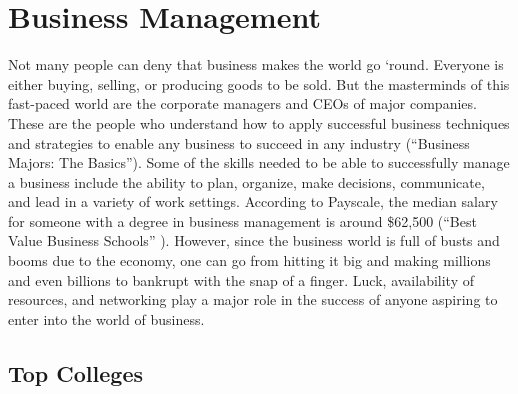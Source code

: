 \chapter{Business Management}
\begin{multicols}{2}

Not many people can deny that business makes the world go ‘round. Everyone is either buying, selling, or producing goods to be sold. But the masterminds of this fast-paced world are the corporate managers and CEOs of major companies. These are the people who understand how to apply successful business techniques and strategies to enable any business to succeed in any industry (“Business Majors: The Basics”). Some of the skills needed to be able to successfully manage a business include the ability to plan, organize, make decisions, communicate, and lead in a variety of work settings.  According to Payscale, the median salary for someone with a degree in business management is around \$62,500 (“Best Value Business Schools” ). However, since the business world is full of busts and booms due to the economy, one can go from hitting it big and making millions and even billions to bankrupt with the snap of a finger. Luck, availability of resources, and networking play a major role in the success of anyone aspiring to enter into the world of business. 

\end{multicols}

\section{Top Colleges}

\begin{table}[H]
\centering
\caption{Undergraduate Colleges}
\label{Buisness Management Undergraduate Colleges}
\end{table}

